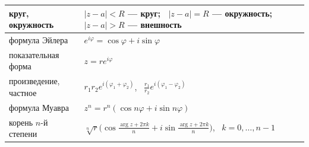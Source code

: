 \documentclass[a4paper,11pt]{article}
\begin{document}
\begin{longtable}{|>{\raggedright\arraybackslash}p{4.4cm}|>{\raggedright\arraybackslash}p{11.7cm}|}
круг, окружность & $|z - a| < R$ --- круг; \ $|z - a| = R$ --- окружность; \ $|z - a| > R$ --- внешность \\ \hline
формула Эйлера & $e^{i\varphi} = \cos\varphi + i\sin\varphi$ \\ \hline
показательная форма & $z = r e^{i\varphi}$ \\ \hline
произведение, частное & $r_1 r_2 e^{i(\varphi_1 + \varphi_2)}$, \ $\frac{r_1}{r_2} e^{i(\varphi_1 - \varphi_2)}$ \\ \hline
формула Муавра & $z^n = r^n(\cos n\varphi + i\sin n\varphi)$ \\ \hline
корень $n$-й степени & $\sqrt[n]{r}\bigl(\cos\frac{\arg z + 2\pi k}{n} + i\sin\frac{\arg z + 2\pi k}{n}\bigr)$, \ $k = 0, \dots, n - 1$ \\ \hline
\end{longtable}
\normalsize
\end{document}
